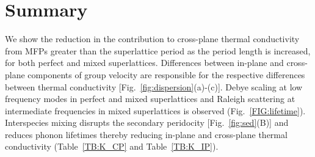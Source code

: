 \section{Summary}

We show the reduction in the contribution to cross-plane thermal conductivity from MFPs greater than the superlattice period as the period length is increased, for both perfect and mixed superlattices. Differences between in-plane and cross-plane components of group velocity are responsible for the respective differences between thermal conductivity [Fig.~\ref{fig:dispersion}(a)-(c)]. Debye scaling at low frequency modes in perfect and mixed superlattices and Raleigh scattering at intermediate frequencies in mixed superlattices is observed (Fig.~\ref{FIG:lifetime}). Interspecies mixing disrupts the secondary peridocity [Fig.~\ref{fig:sed}(B)] and reduces phonon lifetimes thereby reducing in-plane and cross-plane thermal conductivity (Table~\ref{TB:K_CP} and Table~\ref{TB:K_IP}).

